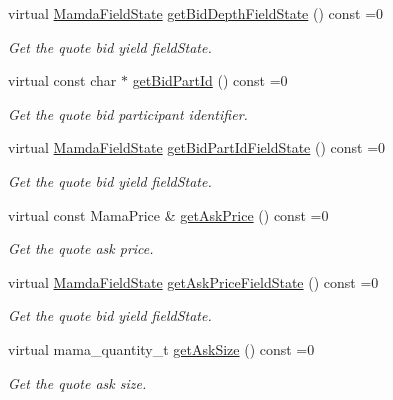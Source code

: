 \begin{CompactItemize}
virtual \hyperlink{namespaceWombat_93aac974f2ab713554fd12a1fa3b7d2a}{Mamda\-Field\-State} \hyperlink{classWombat_1_1MamdaQuoteOutOfSequence_9755be1e5c5d476b19ec99e71d1bd3ea}{get\-Bid\-Depth\-Field\-State} () const =0
\begin{CompactList}\small\item\em Get the quote bid yield field\-State. \item\end{CompactList}\item 
virtual const char $\ast$ \hyperlink{classWombat_1_1MamdaQuoteOutOfSequence_b48217f292612f65d8a0ab93954a223c}{get\-Bid\-Part\-Id} () const =0
\begin{CompactList}\small\item\em Get the quote bid participant identifier. \item\end{CompactList}\item 
virtual \hyperlink{namespaceWombat_93aac974f2ab713554fd12a1fa3b7d2a}{Mamda\-Field\-State} \hyperlink{classWombat_1_1MamdaQuoteOutOfSequence_f98691d7c7a4d1234474a849fbc15c36}{get\-Bid\-Part\-Id\-Field\-State} () const =0
\begin{CompactList}\small\item\em Get the quote bid yield field\-State. \item\end{CompactList}\item 
virtual const Mama\-Price \& \hyperlink{classWombat_1_1MamdaQuoteOutOfSequence_59c673bb5940ecc1b3096a7e523eaf2f}{get\-Ask\-Price} () const =0
\begin{CompactList}\small\item\em Get the quote ask price. \item\end{CompactList}\item 
virtual \hyperlink{namespaceWombat_93aac974f2ab713554fd12a1fa3b7d2a}{Mamda\-Field\-State} \hyperlink{classWombat_1_1MamdaQuoteOutOfSequence_40369fc6cc5d586d7be261e868895988}{get\-Ask\-Price\-Field\-State} () const =0
\begin{CompactList}\small\item\em Get the quote bid yield field\-State. \item\end{CompactList}\item 
virtual mama\_\-quantity\_\-t \hyperlink{classWombat_1_1MamdaQuoteOutOfSequence_4ce63ffd5bba87b803bb07ebceb53dc1}{get\-Ask\-Size} () const =0
\begin{CompactList}\small\item\em Get the quote ask size. \item\end{CompactList}\item 

\end{CompactItemize}
